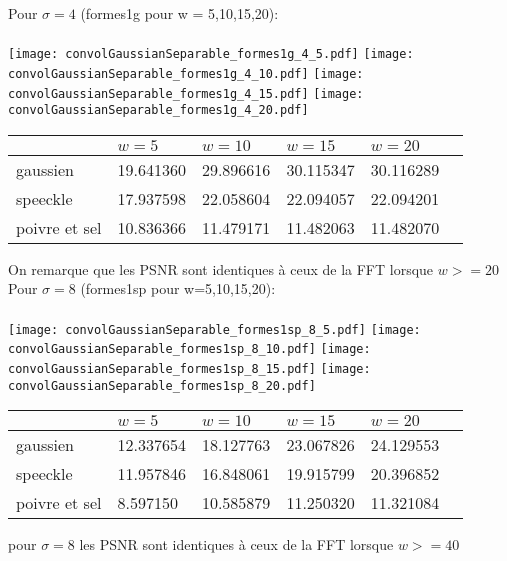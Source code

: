 \documentclass[12pt]{article}
\numberwithin{equation}{section}
\begin{document}
Pour $\sigma = 4$ (formes1g pour w = 5,10,15,20):\\\\
\texttt{[image: convolGaussianSeparable\_formes1g\_4\_5.pdf]}
\texttt{[image: convolGaussianSeparable\_formes1g\_4\_10.pdf]}
\texttt{[image: convolGaussianSeparable\_formes1g\_4\_15.pdf]}
\texttt{[image: convolGaussianSeparable\_formes1g\_4\_20.pdf]}

\begin{center}
  \begin{tabular}{|l|l|l|l|l|l|}
    \hline
    & $w = 5$ & $w = 10$ & $w = 15$  & $w = 20$ \\
    \hline
    gaussien & 19.641360  & 29.896616  & 30.115347  & 30.116289\\
    \hline
    speeckle & 17.937598  & 22.058604  & 22.094057  & 22.094201\\
    \hline
    poivre et sel & 10.836366 & 11.479171 & 11.482063  & 11.482070\\
    \hline
  \end{tabular}
\end{center}
On remarque que les PSNR sont identiques à ceux de la FFT lorsque $w >= 20$\\

Pour $\sigma = 8$ (formes1sp pour w=5,10,15,20): \\\\
\texttt{[image: convolGaussianSeparable\_formes1sp\_8\_5.pdf]}
\texttt{[image: convolGaussianSeparable\_formes1sp\_8\_10.pdf]}
\texttt{[image: convolGaussianSeparable\_formes1sp\_8\_15.pdf]}
\texttt{[image: convolGaussianSeparable\_formes1sp\_8\_20.pdf]}
\begin{center}
  \begin{tabular}{|l|l|l|l|l|l|}
    \hline
    & $w = 5$ & $w = 10$ & $w = 15$  & $w = 20$ \\
    \hline
    gaussien & 12.337654  & 18.127763   & 23.067826  & 24.129553\\
    \hline
    speeckle & 11.957846   & 16.848061  &  19.915799  & 20.396852 \\
    \hline
    poivre et sel & 8.597150  &  10.585879 & 11.250320  & 11.321084 \\
    \hline
  \end{tabular}
\end{center}
pour $\sigma = 8$ les PSNR sont identiques à ceux de la FFT lorsque $w >= 40$\\
\end{document}
